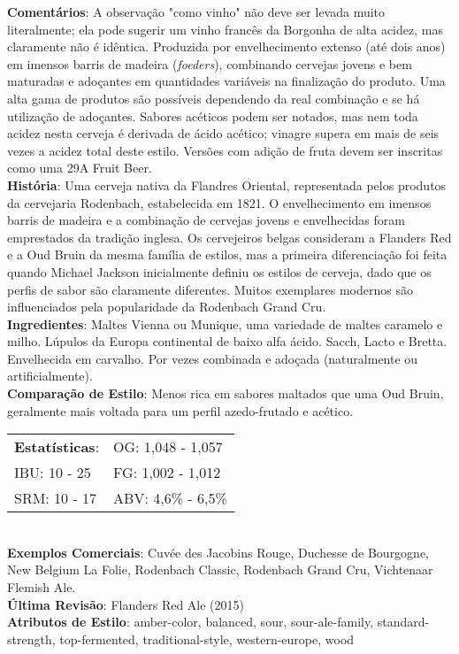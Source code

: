 \textbf{Comentários}: A observação "como vinho" não deve ser levada muito literalmente; ela pode sugerir um vinho francês da Borgonha de alta acidez, mas claramente não é idêntica. Produzida por envelhecimento extenso (até dois anos) em imensos barris de madeira (\textit{foeders}), combinando cervejas jovens e bem maturadas e adoçantes em quantidades variáveis na finalização do produto. Uma alta gama de produtos são possíveis dependendo da real combinação e se há utilização de adoçantes. Sabores acéticos podem ser notados, mas nem toda acidez nesta cerveja é derivada de ácido acético; vinagre supera em mais de seis vezes a acidez total deste estilo. Versões com adição de fruta devem ser inscritas como uma 29A Fruit Beer. \\
\textbf{História}: Uma cerveja nativa da Flandres Oriental, representada pelos produtos da cervejaria Rodenbach, estabelecida em 1821. O envelhecimento em imensos barris de madeira e a combinação de cervejas jovens e envelhecidas foram emprestados da tradição inglesa. Os cervejeiros belgas consideram a Flanders Red e a Oud Bruin da mesma família de estilos, mas a primeira diferenciação foi feita quando Michael Jackson inicialmente definiu os estilos de cerveja, dado que os perfis de sabor são claramente diferentes. Muitos exemplares modernos são influenciados pela popularidade da Rodenbach Grand Cru. \\
\textbf{Ingredientes}: Maltes Vienna ou Munique, uma variedade de maltes caramelo e milho. Lúpulos da Europa continental de baixo alfa ácido. Sacch, Lacto e Bretta. Envelhecida em carvalho. Por vezes combinada e adoçada (naturalmente ou artificialmente). \\
\textbf{Comparação de Estilo}: Menos rica em sabores maltados que uma Oud Bruin, geralmente mais voltada para um perfil azedo-frutado e acético. \\
\begin{tabular}{@{}p{35mm}p{35mm}@{}}
  \textbf{Estatísticas}: & OG: 1,048 - 1,057 \\
  IBU: 10 - 25  & FG: 1,002 - 1,012  \\
  SRM: 10 - 17  & ABV: 4,6\% - 6,5\%
\end{tabular}\\
\textbf{Exemplos Comerciais}: Cuvée des Jacobins Rouge, Duchesse de Bourgogne, New Belgium La Folie, Rodenbach Classic, Rodenbach Grand Cru, Vichtenaar Flemish Ale. \\
\textbf{Última Revisão}: Flanders Red Ale (2015) \\
\textbf{Atributos de Estilo}: amber-color, balanced, sour, sour-ale-family, standard-strength, top-fermented, traditional-style, western-europe, wood
